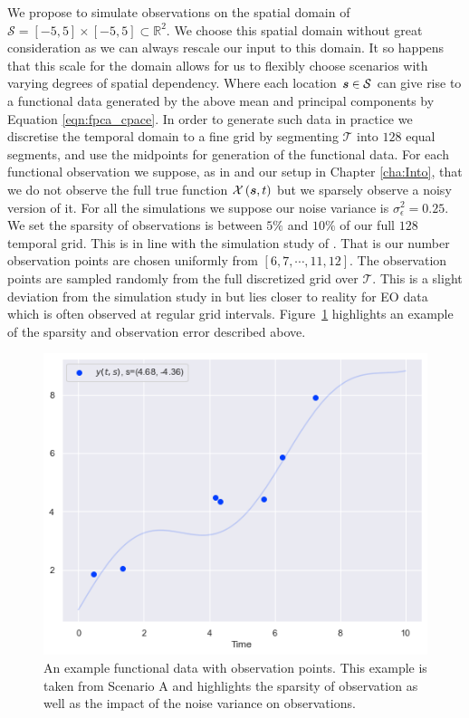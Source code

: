 We propose to simulate observations on the spatial domain of $\mathcal{S} = \left[-5, 5\right] \times \left[-5, 5\right] \subset \mathbb{R}^2$.
We choose this spatial domain without great consideration as we can always rescale our input to this domain.
It so happens that this scale for the domain allows for us to flexibly choose scenarios with varying degrees of spatial dependency.
Where each location $\bm{{s}} \in \mathcal{S}$ can give rise to a functional data generated by the above mean and principal components by Equation \eqref{eqn:fpca_cpace}.
In order to generate such data in practice we discretise the temporal domain to a fine grid by segmenting $\mathcal{T}$ into $128$ equal segments, and use the midpoints for generation of the functional data.
For each functional observation we suppose, as in \citep{yao_functional_2005} and our setup in Chapter \ref{cha:Into}, that we do not observe the full true function $\mathcal{X}\left(\bm{{s}}, t\right)$ but we sparsely observe a noisy version of it.
For all the simulations we suppose our noise variance is $\sigma^2_\epsilon = 0.25$. 
We set the sparsity of observations is between $5\%$ and $10\%$ of our full $128$ temporal grid.
This is in line with the simulation study of \citeauthor{yao_functional_2005}.
That is our number observation points are chosen uniformly from $\left[6, 7, \cdots, 11, 12\right]$.
The observation points are sampled randomly from the full discretized grid over $\mathcal{T}$.
This is a slight deviation from the simulation study in \citep{yao_functional_2005} but lies closer to reality for EO data which is often observed at regular grid intervals.
Figure~\ref{fig:sim_example} highlights an example of the sparsity and observation error described above.

\begin{figure}
	\centering
	\includegraphics[width=\textwidth]{sim_ex}
	\caption{An example functional data with observation points. This example is taken from Scenario A and highlights the sparsity of observation as well as the impact of the noise variance on observations.}
	\label{fig:sim_example}
\end{figure}


